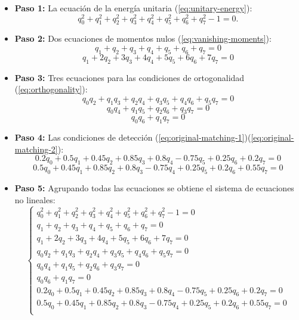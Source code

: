 \begin{itemize}
	\item \textbf{Paso 1:} La ecuación de la energía unitaria (\ref{eq:unitary-energy}):
		\begin{equation}
			q_0^2 + q_1^2 + q_2^2 + q_3^2 + q_4^2 + q_5^2 + q_6^2 + q_7^2 - 1 = 0.
		\end{equation}
	\item \textbf{Paso 2:} Dos ecuaciones de momentos nulos (\ref{eq:vanishing-moments}):
		\begin{equation}
			q_1 + q_2 + q_3 + q_4 + q_5 + q_6 + q_7  = 0
		\end{equation}
		\begin{equation}
			q_1 + 2q_2 + 3q_3 + 4q_4 + 5q_5 + 6q_6 + 7q_7 = 0
		\end{equation}
	\item \textbf{Paso 3:} Tres ecuaciones para las condiciones de ortogonalidad (\ref{eq:orthogonality}):
		\begin{equation}
			q_0q_2 + q_1q_3 + q_2q_4 + q_3q_5 + q_4q_6 + q_5q_7 = 0
		\end{equation}
		\begin{equation}
			q_0q_4 + q_1q_5 + q_2q_6 + q_3q_7 = 0
		\end{equation}
		\begin{equation}
			q_0q_6 + q_1q_7 = 0
		\end{equation}
	\item \textbf{Paso 4:} Las condiciones de detección (\ref{eq:original-matching-1})(\ref{eq:original-matching-2}): 
		\begin{equation}
			0.2q_0 + 0.5q_1 + 0.45q_2 + 0.85q_3 + 0.8q_4 - 0.75q_5 + 0.25q_6 + 0.2q_7 = 0
		\end{equation}
		\begin{equation}
			0.5q_0 + 0.45q_1 + 0.85q_2 + 0.8q_3 - 0.75q_4 + 0.25q_5 + 0.2q_6 + 0.55q_7 = 0
		\end{equation}
	\item \textbf{Paso 5:} Agrupando todas las ecuaciones se obtiene el sistema de ecuaciones no lineales:
		\begin{equation}\label{eq:system}
			\left\{ \begin{array}{rcl}
						q_0^2 + q_1^2 + q_2^2 + q_3^2 + q_4^2 + q_5^2 + q_6^2 + q_7^2 - 1 = 0 \\
						q_1 + q_2 + q_3 + q_4 + q_5 + q_6 + q_7  = 0 \\
						q_1 + 2q_2 + 3q_3 + 4q_4 + 5q_5 + 6q_6 + 7q_7 = 0 \\
						q_0q_2 + q_1q_3 + q_2q_4 + q_3q_5 + q_4q_6 + q_5q_7 = 0 \\
						q_0q_4 + q_1q_5 + q_2q_6 + q_3q_7 = 0 \\
						q_0q_6 + q_1q_7 = 0 \\
						0.2q_0 + 0.5q_1 + 0.45q_2 + 0.85q_3 + 0.8q_4 - 0.75q_5 + 0.25q_6 + 0.2q_7  = 0\\
						0.5q_0 + 0.45q_1 + 0.85q_2 + 0.8q_3 - 0.75q_4 + 0.25q_5 + 0.2q_6 + 0.55q_7 = 0\\
					\end{array}
				\right.
			\end{equation}
\end{itemize}

